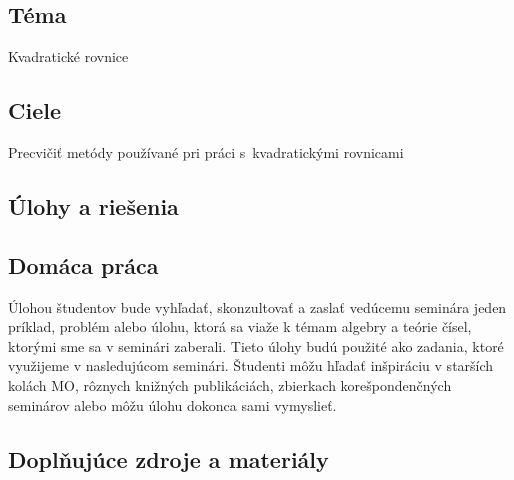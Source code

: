 

\subsection*{Téma}
Kvadratické rovnice

\subsection*{Ciele}
Precvičiť metódy používané pri práci s~kvadratickými rovnicami

\subsection*{Úlohy a riešenia}















\subsection*{Domáca práca}

Úlohou študentov bude vyhľadať, skonzultovať a zaslať vedúcemu seminára jeden príklad, problém alebo úlohu, ktorá sa viaže k témam algebry a teórie čísel, ktorými sme sa v seminári zaberali. Tieto úlohy budú použité ako zadania, ktoré využijeme v nasledujúcom seminári. Študenti môžu hľadať inšpiráciu v starších kolách MO, rôznych knižných publikáciách, zbierkach korešpondenčných seminárov alebo môžu úlohu dokonca sami vymyslieť.


\subsection*{Doplňujúce zdroje a materiály}



